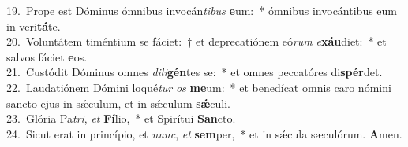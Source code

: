 {19.~}Prope est Dóminus ómnibus invocán\textit{ti}\textit{bus} \textbf{e}um:~* ómnibus invocántibus eum in veri\textbf{tá}te.\\
{20.~}Voluntátem timéntium se fáciet:~† et deprecatiónem eó\textit{rum} \textit{e}\textbf{xáu}diet:~* et salvos fáciet \textbf{e}os.\\
{21.~}Custódit Dóminus omnes \textit{di}\textit{li}\textbf{gén}tes se:~* et omnes peccatóres di\textbf{spér}det.\\
{22.~}Laudatiónem Dómini loqué\textit{tur} \textit{os} \textbf{me}um:~* et benedícat omnis caro nómini sancto ejus in sǽculum, et in sǽculum \textbf{sǽ}culi.\\
{23.~}Glória Pa\textit{tri}, \textit{et} \textbf{Fí}lio,~* et Spirítui \textbf{San}cto.\\
{24.~}Sicut erat in princípio, et \textit{nunc}, \textit{et} \textbf{sem}per,~* et in sǽcula sæculórum. \textbf{A}men.\\
